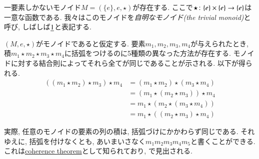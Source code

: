 \begin{example}[自明なモノイド]\label{ex:trivial monoid}


一要素しかないモノイド$M=(\{e\},e,\star)$が存在する. ここで$\star\colon\{e\}\times\{e\}\rightarrow\{e\}$は一意な函数である. 我々はこのモノイドを\emph{自明なモノイド(the trivial monoid)}と呼び, しばしば$\underline{1}$と表記する.

\end{example}

\begin{example}

$(M,e,\star)$がモノイドであると仮定する. 要素$m_1,m_2,m_3,m_4$が与えられたとき, 積$m_1\star m_2\star m_3\star m_4$に括弧をつけるのに5種類の異なった方法が存在する. モノイドに対する結合則によってそれら全てが同じであることが示される. 以下が得られる.
\begin{align*}
((m_1\star m_2)\star m_3)\star m_4&=(m_1\star m_2)\star (m_3\star m_4)\\
&=(m_1\star(m_2\star m_3))\star m_4\\
&=m_1\star(m_2\star (m_3\star m_4))\\
&=m_1\star((m_2\star m_3)\star m_4)
\end{align*}


実際, 任意のモノイドの要素の列の積は, 括弧づけにかかわらず同じである. それゆえに, 括弧を付けなくとも, あいまいさなく$m_1m_2m_3m_4m_5$と書くことができる. これは\href{http://en.wikipedia.org/wiki/Coherence_theorem}{\text coherence theorem}として知られており, \cite{Mac}で見出される.

\end{example}

